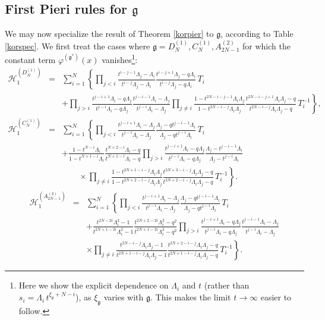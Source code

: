 \documentclass[12pt]{amsart}
\newcommand{\g}{{\mathfrak{g}}}
\newcommand{\cH}{{\mathcal{H}}}
\newcommand{\lL}{{\Lambda}}
\numberwithin{equation}{section}
\begin{document}
\subsection{First Pieri rules for $\g$}\label{firpierapp}

%

We may now specialize the result of Theorem \ref{korpier} to $\g$, according to Table \ref{korspec}. We first treat the cases where $\g=D_N^{(1)},C_N^{(1)},A_{2N-1}^{(2)}$ for which the constant term $\varphi^{(\g^*)}(x)$ vanishes\footnote{ Here we show the explicit dependence on $\lL_i$ and $t$ (rather than $s_i=\lL_i\, t^{\xi_\g+N-i}$), as $\xi_\g$ varies with $\g$. This makes the limit $t\to\infty$ easier to follow.}:
\begin{eqnarray*}
\cH_1^{(D_N^{(1)})}&=&\sum_{i=1}^N\left\{\prod_{j<i} \frac{t^{i-j-1} \lL_j -\lL_i}{t^{i-j}\lL_j-\lL_i}\frac{t^{i-j+1} \lL_j -q \lL_i}{t^{i-j}\lL_j-q \lL_i} \, T_i \right. \\
&&\left. +\prod_{j>i} \frac{t^{j-i+1} \lL_i-q\lL_j}{t^{j-i}\lL_i-q\lL_j}\frac{t^{j-i-1} \lL_i-\lL_j}{t^{j-i}\lL_i-\lL_j} 
\prod_{j\neq i}\frac{1-t^{2N-i-j-1}\lL_i\lL_j}{1-t^{2N-i-j}\lL_i\lL_j} \frac{t^{2N-i-j+1}\lL_i\lL_j-q}{t^{2N-i-j}\lL_i \lL_j-q}\, T_i^{-1}\right\},\\
%
%
\cH_1^{(C_N^{(1)})}&=&\sum_{i=1}^N \left\{ \prod_{j<i} \frac{t^{j-i+1} \lL_i-\lL_j}{t^{j-i} \lL_i-\lL_j}\frac{\lL_j-qt^{j-i-1}\lL_i}{\lL_j-qt^{j-i}\lL_i} \,T_i \right. \\
&&+ \frac{1 -t^{N-i}\lL_i}{1-t^{N+1-i}\lL_i}\frac{t^{N+2-i}\lL_i-q}{t^{N+1-i}\lL_i-q} 
\prod_{j>i}\frac{t^{j-i+1} \lL_i-q\lL_j}{t^{j-i} \lL_i-q\lL_j}\frac{\lL_j-t^{j-i-1}\lL_i}{\lL_j-t^{j-i}\lL_i}\\
&&\qquad \times \left.
\prod_{j\neq i} \frac{1 -t^{2N+1-i-j}\lL_i \lL_j}{1-t^{2N+2-i-j}\lL_i\lL_j} \frac{t^{2N+3-i-j}\lL_i\lL_j-q}{t^{2N+2-i-j}\lL_i\lL_j-q}\, T_i^{-1}  \right\}.
\end{eqnarray*}
\begin{eqnarray*}
\cH_1^{(A_{2N-1}^{(2)})}&=&\sum_{i=1}^N\left\{ 
\prod_{j<i} \frac{t^{j-i+1}\Lambda_i -\Lambda_j}{t^{j-i}\Lambda_i -\Lambda_j} \frac{\lL_j-q t^{j-i-1}\lL_i}{\lL_j-q t^{j-i}\lL_i}\, T_i\right. \\
&&\left. +\frac{t^{2N-2i}\Lambda_i^2-1}{t^{2N+1-2i}\Lambda_i^2-1}
\frac{t^{2N+2-2i}\Lambda_i^2-q^2}{t^{2N+1-2i}\Lambda_i^2-q^2}
\prod_{j>i} 
\frac{t^{j-i+1}\Lambda_i-q \Lambda_j}{t^{j-i}\Lambda_i-q \Lambda_j}\frac{t^{j-i-1}\Lambda_i-\Lambda_j}{t^{j-i}\Lambda_i-\Lambda_j} \right. \\
&&\left. \times 
\prod_{j\neq i} 
\frac{t^{2N-i-j}\Lambda_i\Lambda_j-1}{t^{2N+1-i-j}\Lambda_i\Lambda_j-1}
\frac{t^{2N+2-i-j}\Lambda_i\Lambda_j-q}{t^{2N+1-i-j}\Lambda_i\Lambda_j-q}\, T_i^{-1}\right\}.
\end{eqnarray*}
\end{document}
